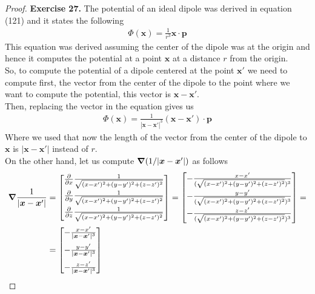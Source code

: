\documentclass[11pt]{article}
\theoremstyle{definition}
\begin{document}
\cleardoublepage
\begin{proof}{\textbf{Exercise 27.}}
The potential of an ideal dipole was derived in equation (121) and it states
the following
\begin{align*}
    \Phi(\bm{x}) = \frac{1}{r^3} \bm{x} \cdot \bm{p}
\end{align*}
This equation was derived assuming the center of the dipole was at the origin
and hence it computes the potential at a point $\bm{x}$ at a distance $r$ from
the origin.
\\
So, to compute the potential of a dipole centered at the point $\bm{x}'$ we
need to compute first, the vector from the center of the dipole to the point
where we want to compute the potential, this vector is $\bm{x} - \bm{x}'$.
\\
Then, replacing the vector in the equation gives us
\begin{align*}
    \Phi(\bm{x}) = \frac{1}{|\bm{x} - \bm{x}'|^3} (\bm{x} - \bm{x}') \cdot \bm{p}
\end{align*}
Where we used that now the length of the vector from the center of the dipole
to $\bm{x}$ is $|\bm{x} - \bm{x}'|$ instead of $r$.
\\
On the other hand, let us compute $\grad (1/|\bm{x} - \bm{x}'|)$ as follows
\begin{align*}
    \grad \frac{1}{|\bm{x} - \bm{x}'|} &= \begin{bmatrix}
        \pdv{x}\frac{1}{\sqrt{(x - x')^2 + (y - y')^2 + (z - z')^2}}\\[7pt]
        \pdv{y}\frac{1}{\sqrt{(x - x')^2 + (y - y')^2 + (z - z')^2}}\\[7pt]
        \pdv{z}\frac{1}{\sqrt{(x - x')^2 + (y - y')^2 + (z - z')^2}}
    \end{bmatrix}
    = \begin{bmatrix}
        -\frac{x - x'}{(\sqrt{(x - x')^2 + (y - y')^2 + (z - z')^2})^3}\\[7pt]
        -\frac{y - y'}{(\sqrt{(x - x')^2 + (y - y')^2 + (z - z')^2})^3}\\[7pt]
        -\frac{z - z'}{(\sqrt{(x - x')^2 + (y - y')^2 + (z - z')^2})^3}
    \end{bmatrix} = \\
    &= \begin{bmatrix}
        -\frac{x - x'}{|\bm{x}- \bm{x}'|^3}\\[7pt]
        -\frac{y - y'}{|\bm{x}- \bm{x}'|^3}\\[7pt]
        -\frac{z - z'}{|\bm{x}- \bm{x}'|^3}
    \end{bmatrix}

\end{align*}
\end{proof}
\end{document}
